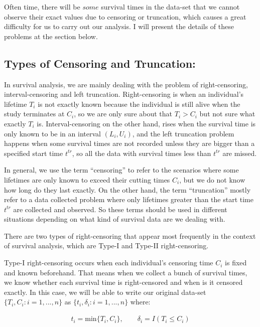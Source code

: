 \documentclass[]{article}
\begin{document}
Often time, there will be \(some\) survival times in the data-set that
we cannot observe their exact values due to censoring or truncation,
which causes a great difficulty for us to carry out our analysis. I will
present the details of these problems at the section below.

\hypertarget{types-of-censoring-and-truncation}{%
\subsection{Types of Censoring and
Truncation:}\label{types-of-censoring-and-truncation}}

In survival analysis, we are mainly dealing with the problem of
right-censoring, interval-censoring and left truncation. Right-censoring
is when an individual's lifetime \(T_i\) is not exactly known because
the individual is still alive when the study terminates at \(C_i\), so
we are only sure about that \(T_i > C_i\) but not sure what exactly
\(T_i\) is. Interval-censoring on the other hand, rises when the
survival time is only known to be in an interval \((L_i,U_i)\), and the
left truncation problem happens when some survival times are not
recorded unless they are bigger than a specified start time \(t^{tr}\),
so all the data with survival times less than \(t^{tr}\) are missed.

In general, we use the term ``censoring'' to refer to the scenarios
where some lifetimes are only known to exceed their cutting times
\(C_i\), but we do not know how long do they last exactly. On the other
hand, the term ``truncation'' mostly refer to a data collected problem
where only lifetimes greater than the start time \(t^{tr}\) are
collected and observed. So these terms should be used in different
situations depending on what kind of survival data are we dealing with.

There are two types of right-censoring that appear most frequently in
the context of survival analysis, which are Type-I and Type-II
right-censoring.

Type-I right-censoring occurs when each individual's censoring time
\(C_i\) is fixed and known beforehand. That means when we collect a
bunch of survival times, we know whether each survival time is
right-censored and when is it censored exactly. In this case, we will be
able to write our original data-set \(\{ T_i,C_i:i=1,...,n \}\) as
\(\{ t_i,\delta_i:i=1,...,n \}\) where:

\begin{equation}\begin{aligned}\label{eqn:transformed data}
t_i = \text{min}\{T_i,C_i \},  \qquad  \delta_i = I(T_i \leq C_i)
\end{aligned}\end{equation}
\end{document}
